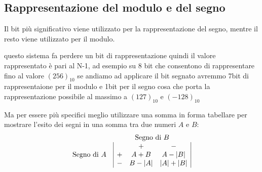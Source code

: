 \subsection{Rappresentazione del modulo e del segno}
\label{sec:modesegnoinbin}
Il bit più significativo viene utilizzato per la rappresentazione del segno, mentre
il resto viene utilizzato per il modulo.
\begin{nota}
  questo sistema fa perdere un bit di rappresentazione quindi il valore rappresentato è
  pari al N-1, ad esempio su 8 bit che consentono di rappresentare fino al
  valore $(256)_{10}$ se andiamo ad applicare il bit segnato avremmo 7bit di
  rappresentaione per il modulo e 1bit per il segno cosa che porta la rappresentazione
  possibile al massimo a $(127)_{10}$ e $(-128)_{10}$
\end{nota}
Ma per essere più specifici meglio utilizzare una somma in forma tabellare per mostrare
l'esito dei segni in una somma tra due numeri $A$ e $B$:
\begin{equation}
  \label{eq:sommabin1}
  \begin{matrix}
    & \text{Segno di } B\\
    \text{Segno di } A &
                       \begin{array}{|ccc|}
                         &+&-\\
                         +& A+B & A-\lvert B\rvert\\
                         - & B-\lvert A\rvert & \lvert A\rvert+\lvert B\rvert
                       \end{array}
  \end{matrix}
\end{equation}

